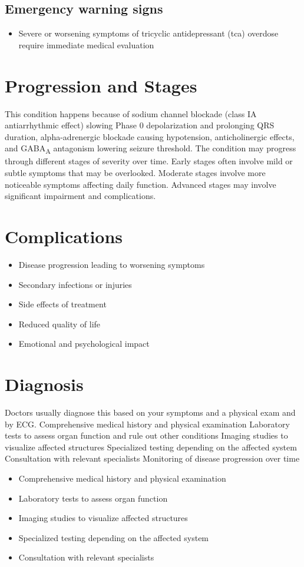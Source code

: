 \subsection{Emergency warning signs}
\begin{itemize}[noitemsep]
  \item Severe or worsening symptoms of tricyclic antidepressant (tca) overdose require immediate medical evaluation
\end{itemize}
\section{Progression and Stages}
This condition happens because of sodium channel blockade (class IA antiarrhythmic effect) slowing Phase 0 depolarization and prolonging QRS duration, alpha-adrenergic blockade causing hypotension, anticholinergic effects, and GABA\textsubscript{A} antagonism lowering seizure threshold. The condition may progress through different stages of severity over time. Early stages often involve mild or subtle symptoms that may be overlooked. Moderate stages involve more noticeable symptoms affecting daily function. Advanced stages may involve significant impairment and complications.
\section{Complications}
\begin{itemize}[noitemsep]
  \item Disease progression leading to worsening symptoms
  \item Secondary infections or injuries
  \item Side effects of treatment
  \item Reduced quality of life
  \item Emotional and psychological impact
\end{itemize}
\section{Diagnosis}
Doctors usually diagnose this based on your symptoms and a physical exam and by ECG. Comprehensive medical history and physical examination Laboratory tests to assess organ function and rule out other conditions Imaging studies to visualize affected structures Specialized testing depending on the affected system Consultation with relevant specialists Monitoring of disease progression over time

\begin{itemize}[noitemsep]
  \item Comprehensive medical history and physical examination
  \item Laboratory tests to assess organ function
  \item Imaging studies to visualize affected structures
  \item Specialized testing depending on the affected system
  \item Consultation with relevant specialists
\end{itemize}

